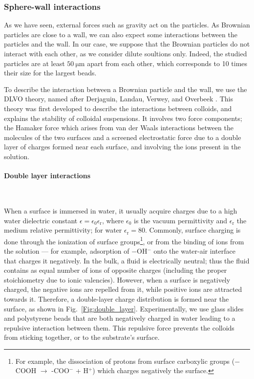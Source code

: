 \subsubsection{Sphere-wall interactions}
\label{Section:sphere-wall}



As we have seen, external forces such as gravity act on the particles. As Brownian particles are close to a wall, we can also expect some interactions between the particles and the wall. In our case, we suppose that the Brownian particles do not interact with each other, as we consider dilute soultions only. Indeed, the studied particles are at least $50 ~ \mathrm{\mu m}$ apart from each other, which corresponds to 10 times their size for the largest beads. 

To describe the interaction between a Brownian particle and the wall, we use the DLVO theory, named after Derjaguin, Landau, Verwey, and Overbeek \cite{israelachvili_intermolecular_2015}. This theory was first developed to describe the interactions between colloids, and explains the stability of colloidal suspensions. It involves two force components; the Hamaker force which arises from van der Waals interactions between the molecules of the two surfaces and a screened electrostatic force due to a double layer of charges formed near each surface, and involving the ions present in the solution. 

\paragraph{Double layer interactions}\mbox{}\\
\vspace{0.10cm}


When a surface is immersed in water, it usually acquire charges \cite{israelachvili_intermolecular_2015} due to a high water dielectric constant $\epsilon = \epsilon_0 \epsilon_\mathrm{r}$, where $\epsilon_0$ is the vacuum permittivity and $\epsilon_\mathrm{r}$ the medium relative permittivity; for water $\epsilon_\mathrm{r} = 80$. Commonly, surface charging is done through the ionization of  surface groups\footnote{For example, the dissociation of protons from surface carboxylic groups \cite{israelachvili_intermolecular_2015} ($-$COOH $\rightarrow$ -COO$^-$ + H$^+$) which charges negatively the surface.}, or from the binding of ions from the solution --- for example, adsorption of $-$OH$^-$ onto the water-air interface that charges it negatively. In the bulk, a fluid is electrically neutral; thus the fluid contains as equal number of ions of opposite charges (including the proper stoichiometry due to ionic valencies). However, when a surface is negatively charged, the negative ions are repelled from it, while positive ions are attracted towards it.  Therefore, a double-layer charge distribution is formed near the surface, as shown in Fig.~\ref{Fig:double_layer}. Experimentally, we use glass slides and polystyrene beads that are both negatively charged in water leading to a repulsive interaction between them. This repulsive force prevents the colloids from sticking together, or to the substrate's surface.

